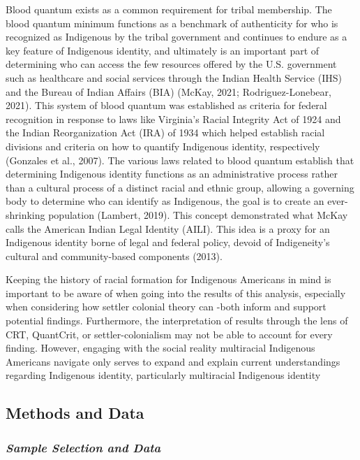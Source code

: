 \documentclass[
  12pt,
  letterpaper,
]{article}
\begin{document}
Blood quantum exists as a common requirement for tribal membership. The
blood quantum minimum functions as a benchmark of authenticity for who
is recognized as Indigenous by the tribal government and continues to
endure as a key feature of Indigenous identity, and ultimately is an
important part of determining who can access the few resources offered
by the U.S. government such as healthcare and social services through
the Indian Health Service (IHS) and the Bureau of Indian Affairs (BIA)
(McKay, 2021; Rodriguez-Lonebear, 2021). This system of blood quantum
was established as criteria for federal recognition in response to laws
like Virginia's Racial Integrity Act of 1924 and the Indian
Reorganization Act (IRA) of 1934 which helped establish racial divisions
and criteria on how to quantify Indigenous identity, respectively
(Gonzales et al., 2007). The various laws related to blood quantum
establish that determining Indigenous identity functions as an
administrative process rather than a cultural process of a distinct
racial and ethnic group, allowing a governing body to determine who can
identify as Indigenous, the goal is to create an ever-shrinking
population (Lambert, 2019). This concept demonstrated what McKay calls
the American Indian Legal Identity (AILI). This idea is a proxy for an
Indigenous identity borne of legal and federal policy, devoid of
Indigeneity's cultural and community-based components (2013).~

Keeping the history of racial formation for Indigenous Americans in mind
is important to be aware of when going into the results of this
analysis, especially when considering how settler colonial theory can
-both inform and support potential findings. Furthermore, the
interpretation of results through the lens of CRT, QuantCrit, or
settler-colonialism may not be able to account for every finding.
However, engaging with the social reality multiracial Indigenous
Americans navigate only serves to expand and explain current
understandings regarding Indigenous identity, particularly multiracial
Indigenous identity

\subsection{Methods and Data}\label{methods-and-data}

\subsubsection{\texorpdfstring{\emph{Sample Selection and
Data}}{Sample Selection and Data}}\label{sample-selection-and-data}
\end{document}
